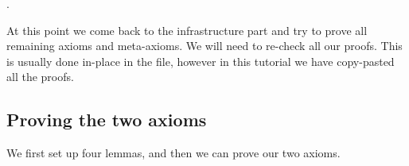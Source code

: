 \documentclass[12pt]{report}
\begin{document}
\begin{coqdoccode}
\coqdocemptyline
\coqdocnoindent
{} .\coqdoceol
\coqdocemptyline
\end{coqdoccode}
At this point we come back to the infrastructure part and try
    to prove all remaining axioms and meta-axioms. We will need to
    re-check all our proofs. This is usually done in-place in the
    file, however in this tutorial we have copy-pasted all the proofs.
\begin{coqdoccode}
\coqdocemptyline
\end{coqdoccode}
\subsection{Proving the two axioms}



 We first set up four lemmas, and then we can prove our two axioms. 
\end{document}
